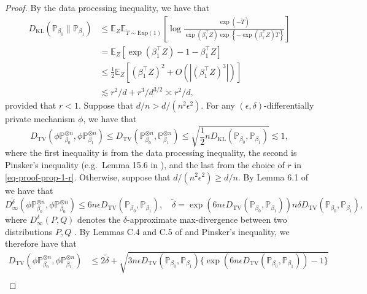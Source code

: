 \documentclass[11pt]{article}
\begin{document}
\begin{proof}
By the data processing inequality, we have that 
    \begin{align*}
        D_{\mathrm{KL}}(\mathbb{P}_{\beta_0} \parallel \mathbb{P}_{\beta_1}) &\leq \mathbb{E}_Z \mathbb{E}_{\tilde{T} \sim \mathrm{Exp}(1)}\left[ \log \frac{\exp(-\tilde{T})}{\exp(\beta_1^\top Z) \exp \left\{-\exp(\beta_1^\top Z) \tilde{T}\right\}}\right] \\
        &= \mathbb{E}_Z \left[ \exp(\beta_1^\top Z) - 1 - \beta_1^\top Z \right] \\
        &\leq \frac{1}{2} \mathbb{E}_Z \left[(\beta_1^\top Z)^2 + O(|(\beta_1^\top Z)^3|) \right] \\
        &\lesssim r^2/d + r^3/d^{3/2} \asymp r^2/d,
    \end{align*}
provided that $r < 1$. Suppose that $d/n >d/(n^2\epsilon^2)$. For any $(\epsilon, \delta)$-differentially private mechanism $\phi$, we have that  
\begin{equation*}
D_{\mathrm{TV}}(\phi \mathbb{P}_{\beta_0}^{\otimes n}, \phi\mathbb{P}_{\beta_1}^{\otimes n}) \leq D_{\mathrm{TV}}(\mathbb{P}_{\beta_0}^{\otimes n}, \mathbb{P}_{\beta_1}^{\otimes n}) \leq \sqrt{\frac{1}{2} n D_{\mathrm{KL}}(\mathbb{P}_{\beta_0}, \mathbb{P}_{\beta_1})} \lesssim 1,
\end{equation*}
where the first inequality is from the data processing inequality, the second is Pinsker's inequality (e.g.~Lemma 15.6 in \citealp{Wainwright2019}), and the last from the choice of $r$ in \eqref{eq-proof-prop-1-r}.
Otherwise, suppose that $d/(n^2\epsilon^2) \geq d/n$. By Lemma 6.1 of \cite{karwa2017finite} we have that 
\begin{equation*}
    D_\infty^{\tilde{\delta}} (\phi\mathbb{P}_{\beta_0}^{\otimes n}, \phi\mathbb{P}_{\beta_0}^{\otimes n}) \leq 6n \epsilon D_{\mathrm{TV}}(\mathbb{P}_{\beta_0}, \mathbb{P}_{\beta_1}), \quad \tilde{\delta }= \exp(6n \epsilon D_{\mathrm{TV}}(\mathbb{P}_{\beta_0}, \mathbb{P}_{\beta_1})) n\delta D_{\mathrm{TV}}(\mathbb{P}_{\beta_0}, \mathbb{P}_{\beta_1}),
\end{equation*}
where $D_\infty^\delta(P, Q)$ denotes the $\delta$-approximate max-divergence between two distributions $P, Q$ \citep[e.g.][Definition 3.6]{dwork2014algorithmic}. By Lemmas C.4 and C.5 of \cite{cai2024optimalfederatedlearningnonparametric} and Pinsker's inequality, we therefore have that 
\begin{align*}
    D_{\mathrm{TV}}(\phi \mathbb{P}_{\beta_0}^{\otimes n}, \phi\mathbb{P}_{\beta_1}^{\otimes n}) &\leq 2\tilde{\delta} +  \sqrt{3n \epsilon D_{\mathrm{TV}}(\mathbb{P}_{\beta_0}, \mathbb{P}_{\beta_1})\{\exp( 6n \epsilon D_{\mathrm{TV}}(\mathbb{P}_{\beta_0}, \mathbb{P}_{\beta_1})) - 1\}} \\

\end{align*}
\end{proof}
\end{document}

